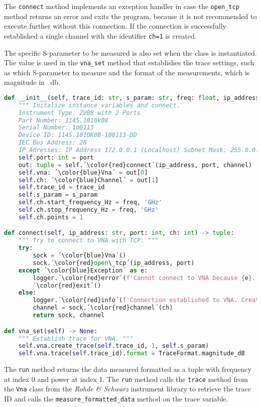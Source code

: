 The \verb+connect+ method implements an exception handler in case the \verb+open_tcp+ method returns an error and exits the program, because it is not recommended to execute further without this connection. If the connection is successfully established a single channel with the identifier \verb+ch=1+ is created. 

The specific S-parameter to be measured is also set when the class is instantiated. The value is used in the \verb+vna_set+ method that establishes the trace settings, such as which S-parameter to measure and the format of the measurements, which is magnitude in \SI{}{\decibel}.

\begin{lstlisting}[language=Python, caption=Method for initialisation of VNA settings including creating VNA trace.]
def __init__(self, trace_id: str, s_param: str, freq: float, ip_address = '172.0.0.1', port: int = 5025, channel = 1) -> None:
    """ Initalize instance variables and connect.
    Instrument Type: ZVB8 with 2 Ports
    Part Number: 1145.1010k08
    Serial Number: 100113
    Device ID: 1145.1010K08-100113-DD
    IEC Bus Address: 20
    IP Adresses: IP Address 172.0.0.1 (Localhost) Subnet Mask: 255.0.0.0 """
    self.port: int = port
    out: tuple = self.´\color{red}connect´(ip_address, port, channel)
    self.vna: ´\color{blue}Vna´ = out[0]
    self.ch: ´\color{blue}Channel´ = out[1]
    self.trace_id = trace_id
    self.s_param = s_param
    self.ch.start_frequency_Hz = freq, 'GHz'
    self.ch.stop_frequency_Hz = freq, 'GHz'
    self.ch.points = 1

def connect(self, ip_address: str, port: int, ch: int) -> tuple:
    """ Try to connect to VNA with TCP. """
    try:
        sock = ´\color{blue}Vna´()
        sock.´\color{red}open\_tcp´(ip_address, port)
    except ´\color{blue}Exception´ as e:
        logger.´\color{red}error´(f'Cannot connect to VNA because {e}.')
        ´\color{red}exit´()
    else:
        logger.´\color{red}info´(f'Connection established to VNA. Creating channel {ch}.')
        channel = sock.´\color{red}channel´(ch)
        return sock, channel

def vna_set(self) -> None:
    """ Establish trace for VNA. """
    self.vna.create_trace(self.trace_id, 1, self.s_param)
    self.vna.trace(self.trace_id).format = TraceFormat.magnitude_dB
\end{lstlisting}

The \verb+run+ method returns the data measured formatted as a tuple with frequency at index 0 and power at index 1. The \verb+run+ method calls the \verb+trace+ method from the \verb+Vna+ class from the \textit{Rohde \& Schwarz} instrument library to retrieve the trace ID and calls the \verb+measure_formatted_data+ method on the trace variable. 

